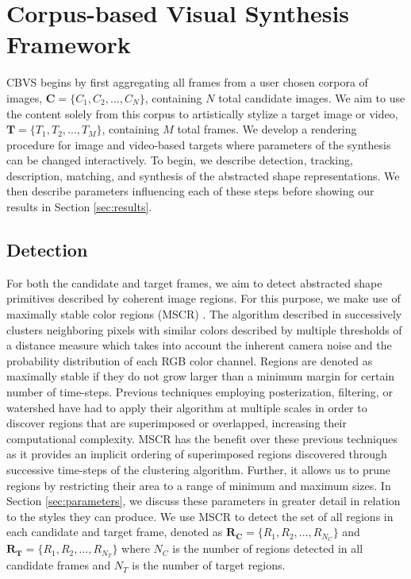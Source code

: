 \documentclass[a4paper,10pt,final]{ThesisStyle}
\begin{document}
\section{Corpus-based Visual Synthesis Framework}  
CBVS begins by first aggregating all frames from a user chosen corpora of images, $\mathbf{C} = \{C_1, C_2, ..., C_N\}$, containing $N$ total candidate images.  We aim to use the content solely from this corpus to artistically stylize a target image or video, $\mathbf{T} = \{T_1, T_2, ..., T_M\}$, containing $M$ total frames.  We develop a rendering procedure for image and video-based targets where parameters of the synthesis can be changed interactively.  To begin, we describe detection, tracking, description, matching, and synthesis of the abstracted shape representations.  We then describe parameters influencing each of these steps before showing our results in Section \ref{sec:results}.
\subsection{Detection}\vspace{-0.4em}
For both the candidate and target frames, we aim to detect abstracted shape primitives described by coherent image regions.  For this purpose, we make use of maximally stable color regions (MSCR) \cite{Forssen2007}.  The algorithm described in \cite{Forssen2007} successively clusters neighboring pixels with similar colors described by multiple thresholds of a distance measure which takes into account the inherent camera noise and the probability distribution of each RGB color channel.  Regions are denoted as maximally stable if they do not grow larger than a minimum margin for certain number of time-steps.  Previous techniques employing posterization, filtering, or watershed have had to apply their algorithm at multiple scales in order to discover regions that are superimposed or overlapped, increasing their computational complexity.  MSCR has the benefit over these previous techniques as it provides an implicit ordering of superimposed regions discovered through successive time-steps of the clustering algorithm.  Further, it allows us to prune regions by restricting their area to a range of minimum and maximum sizes.  In Section \ref{sec:parameters}, we discuss these parameters in greater detail in relation to the styles they can produce. 
We use MSCR to detect the set of all regions in each candidate and target frame, denoted as $\mathbf{R_C} = \{R_1, R_2, ..., R_{N_C}\}$ and $\mathbf{R_T} = \{R_1, R_2, ..., R_{N_T}\}$ where $N_C$ is the number of regions detected in all candidate frames and $N_T$ is the number of target regions.  
\end{document}
